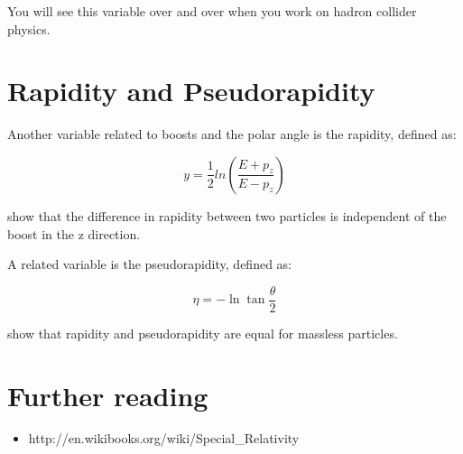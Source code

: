 You will see this variable over and over when you work on hadron collider physics.

\section{Rapidity and Pseudorapidity}

Another variable related to boosts and the polar angle is the rapidity, defined as:

\begin{equation}
	 y =  \frac{1}{2} ln (\frac{E + p_z}{E-p_z})
\end{equation} 
	  

\vspace{.2cm} 
\begin{minipage}{0.9\textwidth} 
\begin{framed}
\begin{exercise}
{show that the difference in rapidity between two particles is independent of the boost in the z direction.}
\end{exercise}
\end{framed} 
\end{minipage}
\vspace{.2cm}




A related variable is the pseudorapidity, defined as:

\begin{equation}
	 \eta  = - \ln{\tan{\frac{\theta}{2}}}
\end{equation} 


\vspace{.2cm} 
\begin{minipage}{0.9\textwidth} 
\begin{framed}
\begin{exercise}
{show that rapidity and pseudorapidity are equal for massless particles.}
\end{exercise}
\end{framed} 
\end{minipage}
\vspace{.2cm}



\section{Further reading}
\begin{itemize}	
\item http://en.wikibooks.org/wiki/Special\_Relativity
\end{itemize}


